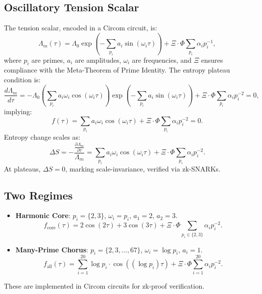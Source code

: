 \documentclass{article}
\theoremstyle{plain}
\begin{document}
\subsection{Oscillatory Tension Scalar}
The tension scalar, encoded in a Circom circuit, is:
\begin{equation}
\Lambda_m(\tau) = \Lambda_0 \exp\left(-\sum_{p_i} a_i \sin(\omega_i \tau)\right) + \Xi \cdot \Phi \sum_{p_i} \alpha_i p_i^{-1},
\end{equation}
where \( p_i \) are primes, \( a_i \) are amplitudes, \( \omega_i \) are frequencies, and \(\Xi\) ensures compliance with the Meta-Theorem of Prime Identity. The entropy plateau condition is:
\begin{equation}
\frac{d \Lambda_m}{d \tau} = -\Lambda_0 \left( \sum_{p_i} a_i \omega_i \cos(\omega_i \tau) \right) \exp\left(-\sum_{p_i} a_i \sin(\omega_i \tau)\right) + \Xi \cdot \Phi \sum_{p_i} \alpha_i p_i^{-2} = 0,
\end{equation}
implying:
\begin{equation}
f(\tau) = \sum_{p_i} a_i \omega_i \cos(\omega_i \tau) + \Xi \cdot \Phi \sum_{p_i} \alpha_i p_i^{-2} = 0.
\end{equation}
Entropy change scales as:
\begin{equation}
\Delta S = -\frac{\frac{\partial \Lambda_m}{\partial \tau}}{\Lambda_m} = \sum_{p_i} a_i \omega_i \cos(\omega_i \tau) + \Xi \cdot \Phi \sum_{p_i} \alpha_i p_i^{-2}.
\end{equation}
At plateaus, \( \Delta S = 0 \), marking scale-invariance, verified via zk-SNARKs.

\subsection{Two Regimes}
\begin{itemize}
    \item \textbf{Harmonic Core}: \( p_i = \{2, 3\} \), \( \omega_i = p_i \), \( a_1 = 2 \), \( a_2 = 3 \).
        \[
        f_{\text{core}}(\tau) = 2 \cos(2\tau) + 3 \cos(3\tau) + \Xi \cdot \Phi \sum_{p_i \in \{2, 3\}} \alpha_i p_i^{-2}.
        \]
    \item \textbf{Many-Prime Chorus}: \( p_i = \{2, 3, \ldots, 67\} \), \( \omega_i = \log p_i \), \( a_i = 1 \).
        \[
        f_{\text{all}}(\tau) = \sum_{i=1}^{20} \log p_i \cdot \cos((\log p_i) \tau) + \Xi \cdot \Phi \sum_{i=1}^{20} \alpha_i p_i^{-2}.
        \]
\end{itemize}
These are implemented in Circom circuits for zk-proof verification.
\end{document}
